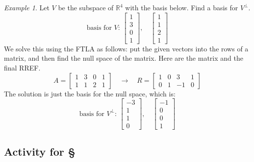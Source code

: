 \documentclass[11pt,oneside]{amsbook}
\newcommand{\R}{\mathbb R}
\theoremstyle{definition}
\theoremstyle{plain}
\theoremstyle{definition}
\theoremstyle{remark}
\newtheorem{example}[theorem]{Example}
\numberwithin{equation}{section}
\numberwithin{figure}{section}
\begin{document}
\begin{example}
  Let $V$ be the subspace of $\R^4$ with the basis below. Find a basis for $V^\perp$.
  \[\text{basis for $V$: }\begin{bmatrix}1\\3\\0\\1\end{bmatrix},\quad
    \begin{bmatrix}1\\1\\2\\1\end{bmatrix}
  \]
  We solve this using the FTLA as follows: put the given vectors into the rows of a matrix, and then find the null space of the matrix. Here are the matrix and the final RREF.
  \[A=\begin{bmatrix}1&3&0&1\\1&1&2&1\end{bmatrix}\quad\rightarrow\quad
  R=\begin{bmatrix}1&0&3&1\\0&1&-1&0\end{bmatrix}
  \]
  The solution is just the basis for the null space, which is:
  \[\text{basis for $V^\perp$: }\begin{bmatrix}-3\\1\\1\\0\end{bmatrix},\quad
  \begin{bmatrix}-1\\0\\0\\1\end{bmatrix}
  \]
\end{example}

\newpage
\subsection*{Activity for \S \thesection}
\end{document}
